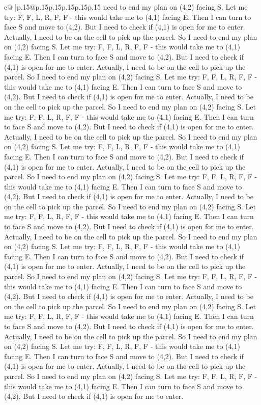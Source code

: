 \documentclass{article}
\begin{document}
{\begin{supertabular}{c@{$\;$}|p{.15\linewidth}@{}p{.15\linewidth}p{.15\linewidth}p{.15\linewidth}p{.15\linewidth}p{.15\linewidth}}
{{{need to end my plan on (4,2) facing S. Let me try: F, F, L, R, F, F {-} this would take me to (4,1) facing E. Then I can turn to face S and move to (4,2). But I need to check if (4,1) is open for me to enter. Actually, I need to be on the cell to pick up the parcel. So I need to end my plan on (4,2) facing S. Let me try: F, F, L, R, F, F {-} this would take me to (4,1) facing E. Then I can turn to face S and move to (4,2). But I need to check if (4,1) is open for me to enter. Actually, I need to be on the cell to pick up the parcel. So I need to end my plan on (4,2) facing S. Let me try: F, F, L, R, F, F {-} this would take me to (4,1) facing E. Then I can turn to face S and move to (4,2). But I need to check if (4,1) is open for me to enter. Actually, I need to be on the cell to pick up the parcel. So I need to end my plan on (4,2) facing S. Let me try: F, F, L, R, F, F {-} this would take me to (4,1) facing E. Then I can turn to face S and move to (4,2). But I need to check if (4,1) is open for me to enter. Actually, I need to be on the cell to pick up the parcel. So I need to end my plan on (4,2) facing S. Let me try: F, F, L, R, F, F {-} this would take me to (4,1) facing E. Then I can turn to face S and move to (4,2). But I need to check if (4,1) is open for me to enter. Actually, I need to be on the cell to pick up the parcel. So I need to end my plan on (4,2) facing S. Let me try: F, F, L, R, F, F {-} this would take me to (4,1) facing E. Then I can turn to face S and move to (4,2). But I need to check if (4,1) is open for me to enter. Actually, I need to be on the cell to pick up the parcel. So I need to end my plan on (4,2) facing S. Let me try: F, F, L, R, F, F {-} this would take me to (4,1) facing E. Then I can turn to face S and move to (4,2). But I need to check if (4,1) is open for me to enter. Actually, I need to be on the cell to pick up the parcel. So I need to end my plan on (4,2) facing S. Let me try: F, F, L, R, F, F {-} this would take me to (4,1) facing E. Then I can turn to face S and move to (4,2). But I need to check if (4,1) is open for me to enter. Actually, I need to be on the cell to pick up the parcel. So I need to end my plan on (4,2) facing S. Let me try: F, F, L, R, F, F {-} this would take me to (4,1) facing E. Then I can turn to face S and move to (4,2). But I need to check if (4,1) is open for me to enter. Actually, I need to be on the cell to pick up the parcel. So I need to end my plan on (4,2) facing S. Let me try: F, F, L, R, F, F {-} this would take me to (4,1) facing E. Then I can turn to face S and move to (4,2). But I need to check if (4,1) is open for me to enter. Actually, I need to be on the cell to pick up the parcel. So I need to end my plan on (4,2) facing S. Let me try: F, F, L, R, F, F {-} this would take me to (4,1) facing E. Then I can turn to face S and move to (4,2). But I need to check if (4,1) is open for me to enter. Actually, I need to be on the cell to pick up the parcel. So I need to end my plan on (4,2) facing S. Let me try: F, F, L, R, F, F {-} this would take me to (4,1) facing E. Then I can turn to face S and move to (4,2). But I need to check if (4,1) is open for me to enter. }}}
\end{supertabular}}
\end{document}

